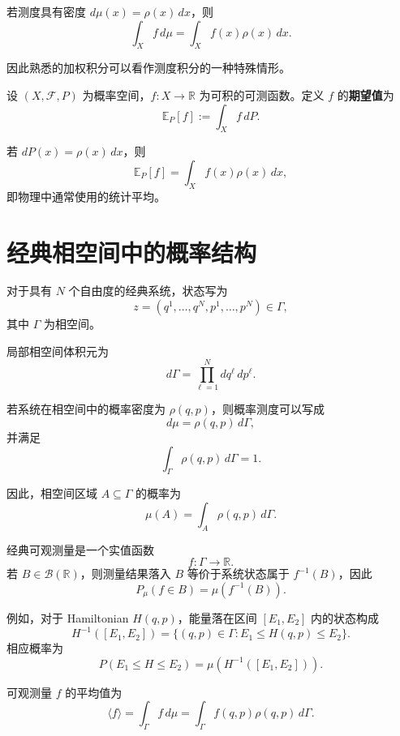 \documentclass[UTF8,a4paper,11pt,openany]{ctexbook}
\begin{document}
若测度具有密度 $d\mu(x)=\rho(x)\,dx$，则
\[
\int_X f\,d\mu
=
\int_X f(x)\rho(x)\,dx.
\]

因此熟悉的加权积分可以看作测度积分的一种特殊情形。

\begin{definition}[期望值]
设 $(X,\mathcal F,P)$ 为概率空间，$f:X\to\mathbb R$ 为可积的可测函数。定义 $f$ 的\textbf{期望值}为
\begin{equation}
    \mathbb E_P[f]
    :=
    \int_X f\,dP.
\end{equation}
\end{definition}

若 $dP(x)=\rho(x)\,dx$，则
\[
\mathbb E_P[f]
=
\int_X f(x)\rho(x)\,dx,
\]
即物理中通常使用的统计平均。

\section{经典相空间中的概率结构}

对于具有 $N$ 个自由度的经典系统，状态写为
\[
z=(q^1,\ldots,q^N,p^1,\ldots,p^N)\in\Gamma,
\]
其中 $\Gamma$ 为相空间。

局部相空间体积元为
\begin{equation}
    d\Gamma
    =
    \prod_{\ell=1}^{N}dq^\ell\,dp^\ell.
\end{equation}

若系统在相空间中的概率密度为 $\rho(q,p)$，则概率测度可以写成
\[
d\mu
=
\rho(q,p)\,d\Gamma,
\]
并满足
\[
\int_\Gamma\rho(q,p)\,d\Gamma=1.
\]

因此，相空间区域 $A\subseteq\Gamma$ 的概率为
\[
\mu(A)
=
\int_A\rho(q,p)\,d\Gamma.
\]

经典可观测量是一个实值函数
\[
f:\Gamma\to\mathbb R.
\]
若 $B\in\mathcal B(\mathbb R)$，则测量结果落入 $B$ 等价于系统状态属于 $f^{-1}(B)$，因此
\begin{equation}
    P_\mu(f\in B)
    =
    \mu\!\left(f^{-1}(B)\right).
\end{equation}

例如，对于 Hamiltonian $H(q,p)$，能量落在区间 $[E_1,E_2]$ 内的状态构成
\[
H^{-1}([E_1,E_2])
=
\{(q,p)\in\Gamma:
E_1\leq H(q,p)\leq E_2\}.
\]
相应概率为
\begin{equation}
    P(E_1\leq H\leq E_2)
    =
    \mu\!\left(H^{-1}([E_1,E_2])\right).
\end{equation}

可观测量 $f$ 的平均值为
\begin{equation}
    \langle f\rangle
    =
    \int_\Gamma f\,d\mu
    =
    \int_\Gamma f(q,p)\rho(q,p)\,d\Gamma.
\end{equation}
\end{document}
